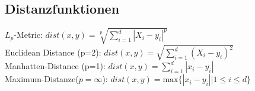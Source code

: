 \documentclass[a4paper]{scrartcl}
\begin{document}
\subsection{Distanzfunktionen}
$L_p$-Metric: $dist(x,y)=\sqrt[p]{\sum\limits_{i=1}^d|X_i-y_i|^p}$\\
Euclidean Distance (p=2): $dist(x,y)=\sqrt{\sum\limits_{i=1}^d(X_i-y_i)^2}$\\
Manhatten-Distance (p=1): $dist(x,y) = \sum\limits_{i=1}^d|x_i-y_i|$\\
Maximum-Distanze($p=\infty$):  $dist(x,y) = \text{max}\{|x_i-y_i||1\leq i\leq d\}$\\
\end{document}
